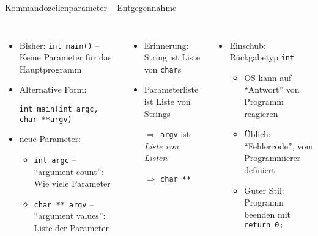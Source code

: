 \begin{frame}[fragile]{Kommandozeilenparameter -- Entgegennahme}
%
\begin{columns}[T]
\begin{itemize}
\item Bisher: \texttt{int main()} -- Keine Parameter für das Hauptprogramm
\item Alternative Form: 
	\begin{codebox}
	\footnotesize\texttt{int main(int argc, char **argv)}
	\end{codebox}
\item neue Parameter:
	\begin{itemize}
	\item \texttt{int argc} -- \enquote{argument count}: Wie viele Parameter
	\item \texttt{char ** argv} -- \enquote{argument values}: Liste der Parameter
	\end{itemize}
\end{itemize}
%
\begin{itemize}
\item Erinnerung: String ist Liste von \texttt{char}s
\item Parameterliste ist Liste von Strings
\item[$\Rightarrow$] \texttt{argv} ist \emph{Liste von Listen}
\item[$\Rightarrow$] \texttt{char **}
\end{itemize}
\begin{itemize}
\item Einschub: Rückgabetyp \texttt{int}
	\begin{itemize}
	\item OS kann auf \enquote{Antwort} von Programm reagieren
	\item Üblich: \enquote{Fehlercode}, vom Programmierer definiert
	\item Guter Stil: Programm beenden mit \texttt{return 0;}	
	\end{itemize}
\end{itemize}
\end{columns}

%
\end{frame}


